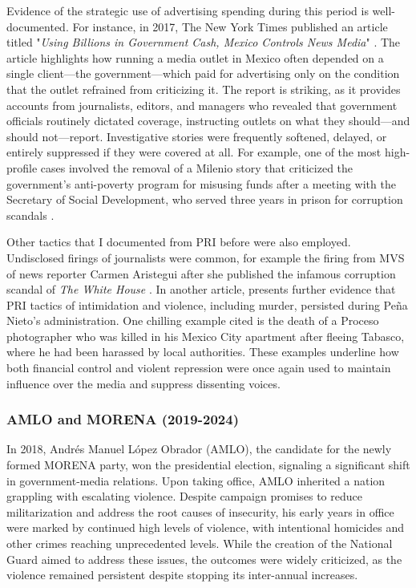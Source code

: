 Evidence of the strategic use of advertising spending during this period is well-documented. For instance, in 2017, The New York Times published an article titled "\textit{Using Billions in Government Cash, Mexico Controls News Media}" \citep{Times}. The article highlights how running a media outlet in Mexico often depended on a single client—the government—which paid for advertising only on the condition that the outlet refrained from criticizing it. The report is striking, as it provides accounts from journalists, editors, and managers who revealed that government officials routinely dictated coverage, instructing outlets on what they should—and should not—report. Investigative stories were frequently softened, delayed, or entirely suppressed if they were covered at all. For example, one of the most high-profile cases involved the removal of a Milenio story that criticized the government’s anti-poverty program for misusing funds after a meeting with the Secretary of Social Development, who served three years in prison for corruption scandals \citep{Milenio-Buzz}.

Other tactics that I documented from PRI before were also employed. Undisclosed firings of journalists were common, for example the firing from MVS of news reporter Carmen Aristegui after she published the infamous corruption scandal of \textit{The White House} \citep{WashPost-Aristegui}. In another article, \cite{Times2-Kill} presents further evidence that PRI tactics of intimidation and violence, including murder, persisted during Peña Nieto's administration. One chilling example cited is the death of a Proceso photographer who was killed in his Mexico City apartment after fleeing Tabasco, where he had been harassed by local authorities. These examples underline how both financial control and violent repression were once again used to maintain influence over the media and suppress dissenting voices.

\subsubsection*{AMLO and MORENA (2019-2024)}

In 2018, Andrés Manuel López Obrador (AMLO), the candidate for the newly formed MORENA party, won the presidential election, signaling a significant shift in government-media relations. Upon taking office, AMLO inherited a nation grappling with escalating violence. Despite campaign promises to reduce militarization and address the root causes of insecurity, his early years in office were marked by continued high levels of violence, with intentional homicides and other crimes reaching unprecedented levels. While the creation of the National Guard aimed to address these issues, the outcomes were widely criticized, as the violence remained persistent despite stopping its inter-annual increases.

